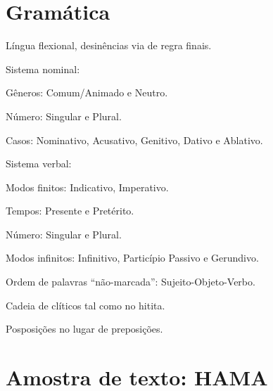 \documentclass[article]{lúvio}
\begin{document}
\chapter{Gramática}

\begin{compactitem}
	\item Língua flexional, desinências via de regra finais.
	\item Sistema nominal:
	\begin{compactitem}
		\item Gêneros: Comum\slash{}Animado e Neutro.
		\item Número: Singular e Plural.
		\item Casos: Nominativo, Acusativo, Genitivo, Dativo e Ablativo.
	\end{compactitem}
	\item Sistema verbal:
	\begin{compactitem}
		\item Modos finitos: Indicativo, Imperativo.
		\item Tempos: Presente e Pretérito.
		\item Número: Singular e Plural.
		\item Modos infinitos: Infinitivo, Particípio Passivo e Gerundivo.
	\end{compactitem}
	\item Ordem de palavras ``não\hyp{}marcada'': Sujeito\hyp{}Objeto\hyp{}Verbo.
	\item Cadeia de clíticos tal como no hitita.
	\item Posposições no lugar de preposições.
\end{compactitem}

\chapter{Amostra de texto: HAMA }
\end{document}

